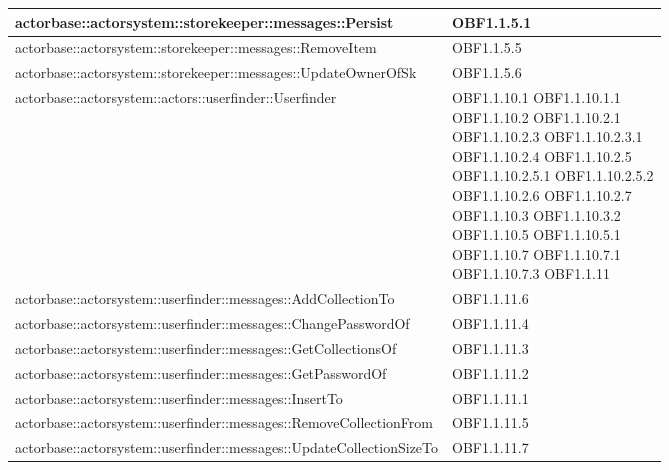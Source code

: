 \documentclass{scalatekids-article}
\begin{document}
\begin{longtable}[H]{|p{12cm}|p{5.5cm}|}
  \hline
  actorbase::actorsystem::storekeeper::messages::Persist & \multiLineCell[t]{OBF1.1.5.1\\}\\
  \hline
  actorbase::actorsystem::storekeeper::messages::RemoveItem & \multiLineCell[t]{OBF1.1.5.5\\}\\
  \hline
  actorbase::actorsystem::storekeeper::messages::UpdateOwnerOfSk & \multiLineCell[t]{OBF1.1.5.6\\}\\
  \hline
  actorbase::actorsystem::actors::userfinder::Userfinder & \multiLineCell[t]{OBF1.1.10.1 OBF1.1.10.1.1\\OBF1.1.10.2 OBF1.1.10.2.1\\OBF1.1.10.2.3 OBF1.1.10.2.3.1\\OBF1.1.10.2.4 OBF1.1.10.2.5\\OBF1.1.10.2.5.1 OBF1.1.10.2.5.2\\OBF1.1.10.2.6 OBF1.1.10.2.7\\OBF1.1.10.3 OBF1.1.10.3.2\\OBF1.1.10.5 OBF1.1.10.5.1\\OBF1.1.10.7 OBF1.1.10.7.1\\OBF1.1.10.7.3 OBF1.1.11\\}\\
  \hline
  actorbase::actorsystem::userfinder::messages::AddCollectionTo & \multiLineCell[t]{OBF1.1.11.6\\}\\
  \hline
  actorbase::actorsystem::userfinder::messages::ChangePasswordOf & \multiLineCell[t]{OBF1.1.11.4\\}\\
  \hline
  actorbase::actorsystem::userfinder::messages::GetCollectionsOf & \multiLineCell[t]{OBF1.1.11.3\\}\\
  \hline
  actorbase::actorsystem::userfinder::messages::GetPasswordOf & \multiLineCell[t]{OBF1.1.11.2\\}\\
  \hline
  actorbase::actorsystem::userfinder::messages::InsertTo & \multiLineCell[t]{OBF1.1.11.1\\}\\
  \hline
  actorbase::actorsystem::userfinder::messages::RemoveCollectionFrom & \multiLineCell[t]{OBF1.1.11.5\\}\\
  \hline
  actorbase::actorsystem::userfinder::messages::UpdateCollectionSizeTo & \multiLineCell[t]{OBF1.1.11.7\\}\\

\end{longtable}
\end{document}
